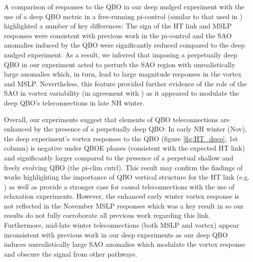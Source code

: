 A comparison of responses to the QBO in our deep nudged experiment with the use of a deep QBO metric in a free-running pi-control (similar to that used in \cite{andrewsObserved2019d}) highlighted a number of key differences: The sign of the HT link and MSLP responses were consistent with previous work in the pi-control and the SAO anomalies induced by the QBO were significantly reduced compared to the deep nudged experiment. As a result, we inferred that imposing a perpetually deep QBO in our experiment acted to perturb the SAO region with unrealistically large anomalies which, in turn, lead to large magnitude responses in the vortex and MSLP. Nevertheless, this feature provided further evidence of the role of the SAO in vortex variability (in agreement with \cite{grayForecasting2020}) as it appeared to modulate the deep QBO's teleconnections in late NH winter. 

Overall, our experiments suggest that elements of QBO teleconnections are enhanced by the presence of a perpetually deep QBO: In early NH winter (Nov), the deep experiment's vortex responses to the QBO (figure \ref{fig:HT_deep}, 1st column) is negative under QBOE phases (consistent with the expected HT link) and significantly larger compared to the presence of a perpetual shallow and freely evolving QBO (the pi-clim cntrl). This result may confirm the findings of works highlighting the importance of QBO vertical structure for the HT link (e.g. \cite{graySurface2018b}) as well as provide a stronger case for causal teleconnections with the use of relaxation experiments. However, the enhanced early winter vortex response is not reflected in the November MSLP responses which was a key result in \cite{andrewsObserved2019d} so our results do not fully corroborate all previous work regarding this link. Furthermore, mid-late winter teleconnections (both MSLP and vortex) appear inconsistent with previous work in our deep experiments as our deep QBO induces unrealistically large SAO anomalies which modulate the vortex response and obscure the signal from other pathways. 

